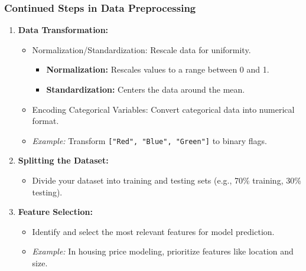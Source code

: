 \documentclass[aspectratio=169]{beamer}
\begin{document}
\begin{frame}[fragile]
    \frametitle{Continued Steps in Data Preprocessing}
    \begin{enumerate}[start=3]
        \item \textbf{Data Transformation:}
            \begin{itemize}
                \item Normalization/Standardization: Rescale data for uniformity.
                    \begin{itemize}
                        \item \textbf{Normalization:} Rescales values to a range between 0 and 1.
                        \item \textbf{Standardization:} Centers the data around the mean.
                    \end{itemize}
                \item Encoding Categorical Variables: Convert categorical data into numerical format.
                    \item \textit{Example:} Transform \texttt{["Red", "Blue", "Green"]} to binary flags.
            \end{itemize}
        \item \textbf{Splitting the Dataset:} 
            \begin{itemize}
                \item Divide your dataset into training and testing sets (e.g., 70\% training, 30\% testing).
            \end{itemize}
        \item \textbf{Feature Selection:}
            \begin{itemize}
                \item Identify and select the most relevant features for model prediction.
                \item \textit{Example:} In housing price modeling, prioritize features like location and size.
            \end{itemize}
    \end{enumerate}
\end{frame}
\end{document}
